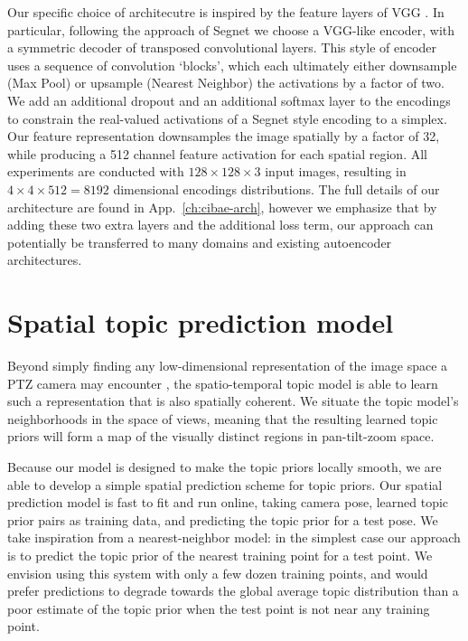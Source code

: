 Our specific choice of architecutre is inspired by the feature layers of VGG \citep{Simonyan14c}. In particular, following the approach of Segnet \citep{BadrinarayananK15} we choose a VGG-like encoder, with a symmetric decoder of transposed convolutional layers. This style of encoder uses a sequence of convolution `blocks', which each ultimately either downsample (Max Pool) or upsample (Nearest Neighbor) the activations by a factor of two. We add an additional dropout and an additional softmax layer to the encodings to constrain the real-valued activations of a Segnet style encoding to a simplex. Our feature representation downsamples the image spatially by a factor of 32, while producing a 512 channel feature activation for each spatial region. All experiments are conducted with $128 \times 128 \times 3$ input images, resulting in $4 \times 4 \times 512 = 8192$ dimensional encodings distributions. The full details of our architecture are found in App.~\ref{ch:cibae-arch}, however we emphasize that by adding these two extra layers and the additional loss term, our approach can potentially be transferred to many domains and existing autoencoder architectures.

\section{Spatial topic prediction model}

Beyond simply finding any low-dimensional representation of the image space a PTZ camera may encounter , the spatio-temporal topic model is able to learn such a representation that is also spatially coherent. We situate the topic model's neighborhoods in the space of views, meaning that the resulting learned topic priors will form a map of the visually distinct regions in pan-tilt-zoom space.

Because our model is designed to make the topic priors locally smooth, we are able to develop a simple spatial prediction scheme for topic priors. Our spatial prediction model is fast to fit and run online, taking camera pose, learned topic prior pairs as training data, and predicting the topic prior for a test pose. We take inspiration from a nearest-neighbor model: in the simplest case our approach is to predict the topic prior of the nearest training point for a test point. We envision using this system with only a few dozen training points, and would prefer predictions to degrade towards the global average topic distribution than a poor estimate of the topic prior when the test point is not near any training point.

